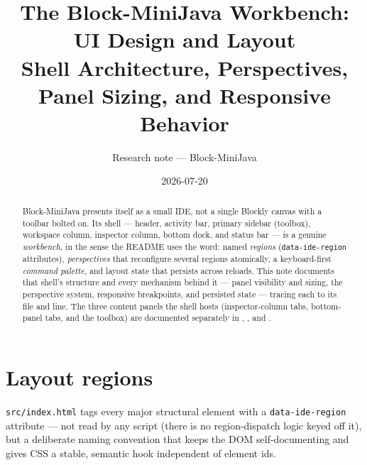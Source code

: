 \documentclass[11pt]{article}
\title{The Block-MiniJava Workbench: UI Design and Layout\\
\large Shell Architecture, Perspectives, Panel Sizing, and Responsive Behavior}
\author{Research note --- Block-MiniJava}
\date{2026-07-20}
\begin{document}
\maketitle

\begin{abstract}
Block-MiniJava presents itself as a small IDE, not a single Blockly canvas
with a toolbar bolted on. Its shell --- header, activity bar, primary
sidebar (toolbox), workspace column, inspector column, bottom dock, and
status bar --- is a genuine \emph{workbench}, in the sense the README uses
the word: named \emph{regions} (\texttt{data-ide-region} attributes),
\emph{perspectives} that reconfigure several regions atomically, a
keyboard-first \emph{command palette}, and layout state that persists
across reloads. This note documents that shell's structure and every
mechanism behind it --- panel visibility and sizing, the perspective
system, responsive breakpoints, and persisted state --- tracing each to its
file and line. The three content panels the shell hosts (inspector-column
tabs, bottom-panel tabs, and the toolbox) are documented separately in
\texttt{}, \texttt{}, and
\texttt{}.
\end{abstract}

\tableofcontents

\section{Layout regions}

\texttt{src/index.html} tags every major structural element with a
\texttt{data-ide-region} attribute --- not read by any script (there is no
region-dispatch logic keyed off it), but a deliberate naming convention
that keeps the DOM self-documenting and gives CSS a stable, semantic hook
independent of element ids.
\end{document}
